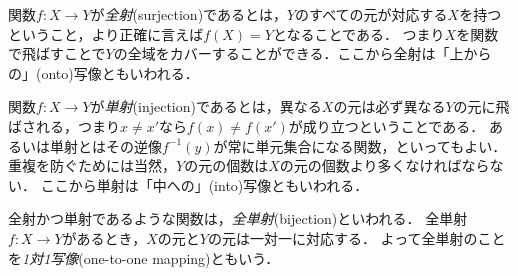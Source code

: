 \documentclass[11pt,a4paper]{jsarticle} %
\begin{document}
関数$f:X \to Y$が\emph{全射}(surjection)であるとは，$Y$のすべての元が対応する$X$を持つということ，より正確に言えば$f(X)=Y$となることである．
つまり$X$を関数で飛ばすことで$Y$の全域をカバーすることができる．ここから全射は「上からの」(onto)写像ともいわれる．

関数$f:X \to Y$が\emph{単射}(injection)であるとは，異なる$X$の元は必ず異なる$Y$の元に飛ばされる，つまり$x \neq x'$なら$f(x) \neq f(x')$が成り立つということである．
あるいは単射とはその逆像$f^{-1}(y)$が常に単元集合になる関数，といってもよい．
重複を防ぐためには当然，$Y$の元の個数は$X$の元の個数より多くなければならない．
ここから単射は「中への」(into)写像ともいわれる．

全射かつ単射であるような関数は，\emph{全単射}(bijection)といわれる．
全単射$f:X \to Y$があるとき，$X$の元と$Y$の元は一対一に対応する．
よって全単射のことを\emph{1対1写像}(one-to-one mapping)ともいう．
\end{document}
